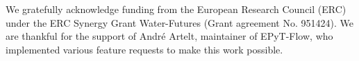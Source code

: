 We gratefully acknowledge funding from the European Research Council (ERC)
under the ERC Synergy Grant Water-Futures (Grant agreement No. 951424). We are
thankful for the support of Andr\'e Artelt, maintainer of EPyT-Flow, who
implemented various feature requests to make this work possible.


